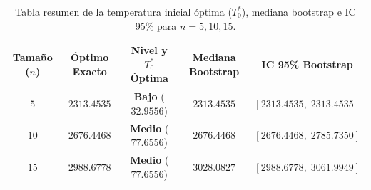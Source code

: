 \documentclass[11pt,letterpaper]{article}
\begin{document}
\begin{table}[H]
\centering
\caption{Tabla resumen de la temperatura inicial óptima ($T_0^*$), mediana bootstrap e IC 95\% para $n = 5, 10, 15$.}
\label{tab:optimal_summary}
\begin{tabular}{@{}ccccc@{}}
\toprule
\textbf{Tamaño ($n$)} & \textbf{Óptimo Exacto} & \textbf{Nivel y $T_0^*$ Óptima} & \textbf{Mediana Bootstrap} & \textbf{IC 95\% Bootstrap} \\
\midrule
$5$  & $2313.4535$ & \textcolor{rojouanl}{\textbf{Bajo}} ($32.9556$)  & $2313.4535$ & $[2313.4535,\; 2313.4535]$ \\
$10$ & $2676.4468$ & \textcolor{rojouanl}{\textbf{Medio}} ($77.6556$) & $2676.4468$ & $[2676.4468,\; 2785.7350]$ \\
$15$ & $2988.6778$ & \textcolor{rojouanl}{\textbf{Medio}} ($77.6556$) & $3028.0827$ & $[2988.6778,\; 3061.9949]$ \\
\bottomrule
\end{tabular}
\end{table}
\end{document}
